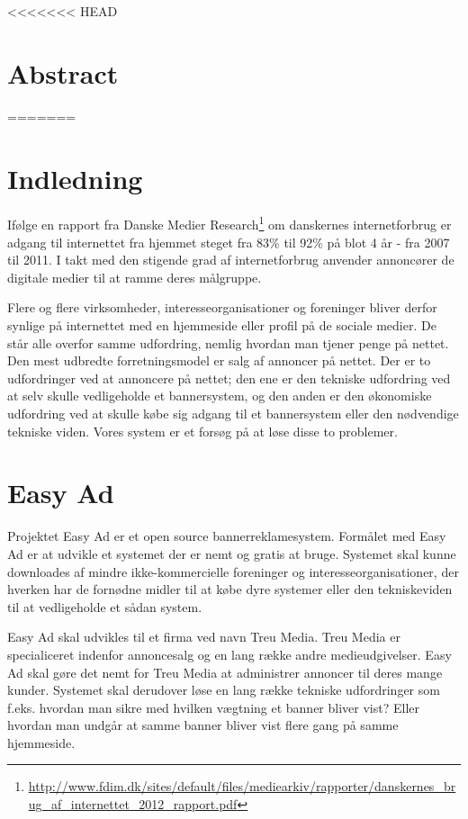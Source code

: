 \documentclass[a4paper,12pt]{article}
\begin{document}
<<<<<<< HEAD
\section{Abstract}
=======
\section{Indledning}
Ifølge en rapport fra Danske Medier Research\footnote{\url{ http://www.fdim.dk/sites/default/files/mediearkiv/rapporter/danskernes\_brug\_af\_internettet\_2012\_rapport.pdf}} om danskernes internetforbrug er adgang til internettet fra hjemmet steget fra 83\% til 92\% på blot 4 år - fra 2007 til 2011. I takt med den stigende grad af internetforbrug anvender annoncører de digitale medier til at ramme deres målgruppe.

Flere og flere virksomheder, interesseorganisationer og foreninger bliver derfor synlige på internettet med en hjemmeside eller profil på de sociale medier. De står alle overfor samme udfordring, nemlig hvordan man tjener penge på nettet. Den mest udbredte forretningsmodel er salg af annoncer på nettet. Der er to udfordringer ved at annoncere på nettet; den ene er den tekniske udfordring ved at selv skulle vedligeholde et bannersystem, og den anden er den økonomiske udfordring ved at skulle købe sig adgang til et bannersystem eller den nødvendige tekniske viden. Vores system er et forsøg på at løse disse to problemer.

\section{Easy Ad}

Projektet Easy Ad er et open source bannerreklamesystem. Formålet med Easy Ad er at udvikle et systemet der er nemt og gratis at bruge. Systemet skal kunne downloades af mindre ikke-kommercielle foreninger og interesseorganisationer, der hverken har de fornødne midler til at købe dyre systemer eller den tekniskeviden til at vedligeholde et sådan system.

Easy Ad skal udvikles til et firma ved navn Treu Media. Treu Media er specialiceret indenfor annoncesalg og en lang række andre medieudgivelser. Easy Ad skal gøre det nemt for Treu Media at administrer annoncer til deres mange kunder. Systemet skal derudover løse en lang række tekniske udfordringer som f.eks. hvordan man sikre med hvilken vægtning et banner bliver vist? Eller hvordan man undgår at samme banner bliver vist flere gang på samme hjemmeside.
\end{document}
